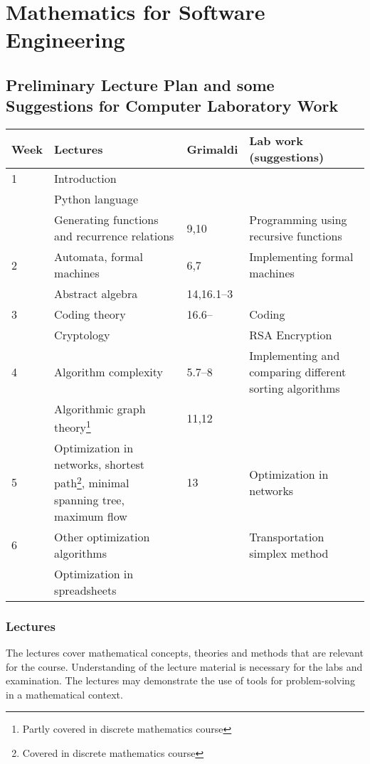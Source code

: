 \documentclass[11pt]{article}
\begin{document}
\section*{Mathematics for Software Engineering} 
\subsection*{Preliminary Lecture Plan and some\\
  Suggestions for Computer Laboratory Work}

\vspace{3ex}
\savenotes
\begin{tabular}{|p{}|p{}|p{}|
    p{}|}
  \hline
  Week&Lectures&Grimaldi&Lab work (suggestions)\\
  \hline
  1&Introduction&&\\
  &Python language&&\\
  &Generating functions and recurrence relations&9,10&Programming
  using recursive functions\\
  \hline
  2&Automata, formal machines&6,7&Implementing formal machines\\
  &Abstract algebra&14,16.1--3&\\
  \hline
  3&Coding theory&16.6--&Coding\\
  &Cryptology&&RSA Encryption\footnotemark[2]\\
  \hline
  4&Algorithm complexity&5.7--8&Implementing and comparing different sorting
  algorithms\\
  &Algorithmic graph theory\footnote{Partly covered in discrete
    mathematics course}&11,12&\\
  \hline
  5&Optimization in networks, shortest path\footnote{Covered in
    discrete mathematics course}, minimal spanning tree\footnotemark[2],
  maximum flow&13&Optimization in networks\\
  \hline
  6&Other optimization algorithms&
  &Transportation simplex method\\
  &Optimization in spreadsheets&&\\
  \hline
\end{tabular}
\spewnotes
\vspace{3ex}

\subsubsection*{Lectures}
The lectures cover mathematical concepts, theories and methods that
are relevant for the course. Understanding of the lecture material is
necessary for the labs and examination. The lectures may demonstrate
the use of tools for problem-solving in a mathematical context.
\end{document}
